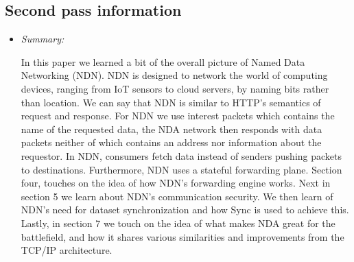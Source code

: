 \documentclass[letterpaper,twocolumn,10pt]{article}
\begin{document}
\subsection{Second pass information}
\label{sec:second}
\begin{itemize}
\item {\it Summary:} 

In this paper we learned a bit of the overall picture of Named Data Networking (NDN). NDN is designed to network 
the world of computing devices, ranging from IoT sensors to cloud servers, by naming bits rather than location. We 
can say that NDN is similar to HTTP's semantics of request and response. For NDN we use interest packets which
contains the name of the requested data, the NDA network then responds with data packets neither of which contains an
address nor information about the requestor. In NDN, consumers fetch data instead of senders pushing packets to 
destinations. Furthermore, NDN uses a stateful forwarding plane. Section four, touches on the idea of how NDN's
forwarding engine works. Next in section 5 we learn about NDN's communication security. We then learn of NDN's
need for dataset synchronization and how Sync is used to achieve this. Lastly, in section 7 we touch on the idea
of what makes NDA great for the battlefield, and how it shares various similarities and improvements from the 
TCP/IP architecture. 

\end{itemize}
\end{document}
